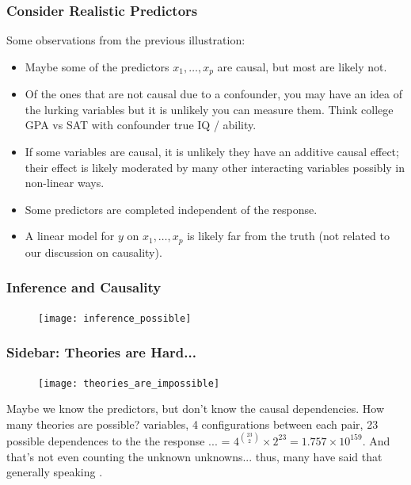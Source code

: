 \documentclass[handout]{beamer}
\begin{document}
\begin{frame}\frametitle{Consider Realistic Predictors}

Some observations from the previous illustration:\pause

\begin{itemize}
\item Maybe some of the predictors $x_1, \ldots, x_p$ are causal, but most are likely not. \pause
\item Of the ones that are not causal due to a confounder, you may have an idea of the lurking variables but it is unlikely you can measure them. Think college GPA vs SAT with confounder true IQ / ability.\pause
\item If some variables are causal, it is unlikely they have an additive causal effect; their effect is likely moderated by many other interacting variables possibly in non-linear ways.\pause
\item Some predictors are completed independent of the response.\pause
\item A linear model for $y$ on $x_1, \ldots, x_p$ is likely far from the truth (not related to our discussion on causality).
\end{itemize}

\end{frame}

\begin{frame}\frametitle{Inference and Causality}

\begin{figure}
\centering
\texttt{[image: inference\_possible]}
\end{figure}

\end{frame}

\begin{frame}\frametitle{Sidebar: Theories are Hard...}
\begin{figure}
\centering
\texttt{[image: theories\_are\_impossible]}
\end{figure}

\footnotesize
Maybe we know the predictors, but don't know the causal dependencies. How many theories are possible?  variables, 4 configurations between each pair, 23 possible dependences to the the response ... = \pause $4^{\binom{23}{2}} \times 2^{23} = 1.757 \times 10^{159}$. And that's not even counting the unknown unknowns... thus, many have said that generally speaking  .

\end{frame}
\end{document}
